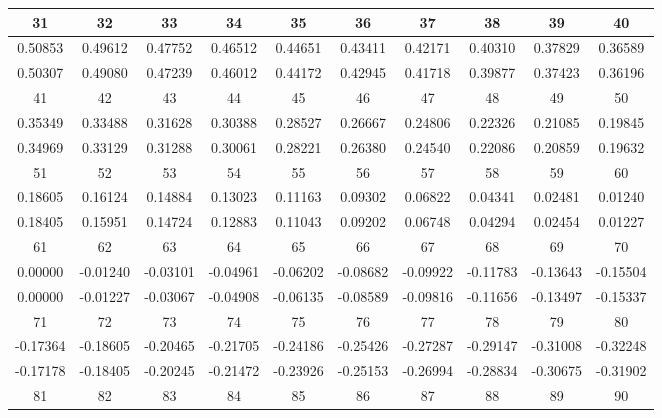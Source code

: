 \documentclass[withoutpreface,bwprint]{cumcmthesis} %
\begin{document}
\begin{center}
\begin{longtable}{cccccccccc}
        \hline
        31       & 32       & 33       & 34       & 35       & 36       & 37       & 38       & 39       & 40       \\
        \hline
        0.50853  & 0.49612  & 0.47752  & 0.46512  & 0.44651  & 0.43411  & 0.42171  & 0.40310  & 0.37829  & 0.36589  \\
        0.50307  & 0.49080  & 0.47239  & 0.46012  & 0.44172  & 0.42945  & 0.41718  & 0.39877  & 0.37423  & 0.36196  \\
        \hline
        41       & 42       & 43       & 44       & 45       & 46       & 47       & 48       & 49       & 50       \\
        \hline
        0.35349  & 0.33488  & 0.31628  & 0.30388  & 0.28527  & 0.26667  & 0.24806  & 0.22326  & 0.21085  & 0.19845  \\
        0.34969  & 0.33129  & 0.31288  & 0.30061  & 0.28221  & 0.26380  & 0.24540  & 0.22086  & 0.20859  & 0.19632  \\
        \hline
        51       & 52       & 53       & 54       & 55       & 56       & 57       & 58       & 59       & 60       \\
        \hline
        0.18605  & 0.16124  & 0.14884  & 0.13023  & 0.11163  & 0.09302  & 0.06822  & 0.04341  & 0.02481  & 0.01240  \\
        0.18405  & 0.15951  & 0.14724  & 0.12883  & 0.11043  & 0.09202  & 0.06748  & 0.04294  & 0.02454  & 0.01227  \\
        \hline
        61       & 62       & 63       & 64       & 65       & 66       & 67       & 68       & 69       & 70       \\
        \hline
        0.00000  & -0.01240 & -0.03101 & -0.04961 & -0.06202 & -0.08682 & -0.09922 & -0.11783 & -0.13643 & -0.15504 \\
        0.00000  & -0.01227 & -0.03067 & -0.04908 & -0.06135 & -0.08589 & -0.09816 & -0.11656 & -0.13497 & -0.15337 \\
        \hline
        71       & 72       & 73       & 74       & 75       & 76       & 77       & 78       & 79       & 80       \\
        \hline
        -0.17364 & -0.18605 & -0.20465 & -0.21705 & -0.24186 & -0.25426 & -0.27287 & -0.29147 & -0.31008 & -0.32248 \\
        -0.17178 & -0.18405 & -0.20245 & -0.21472 & -0.23926 & -0.25153 & -0.26994 & -0.28834 & -0.30675 & -0.31902 \\
        \hline
        81       & 82       & 83       & 84       & 85       & 86       & 87       & 88       & 89       & 90       \\

\end{longtable}
\end{center}
\end{document}
